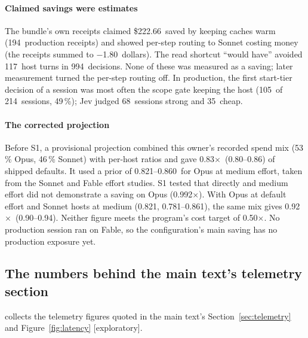 \documentclass[11pt,letterpaper]{article}
\newcommand{\expl}{\mbox{\textsf{\small\color{okgray}[exploratory]}}}
\newcommand{\X}{\ensuremath{\times}}
\newcommand{\AthreeGoal}{0.50}
\newcommand{\AthreeNew}{0.92}
\newcommand{\AthreeNewBand}{0.90--0.94}
\newcommand{\AthreeOld}{0.83}
\newcommand{\AthreeOldBand}{0.80--0.86}
\newcommand{\AthreeOpusPriorHi}{0.860}
\newcommand{\AthreeOpusPriorLo}{0.821}
\newcommand{\AthreeOpusShare}{53}
\newcommand{\AthreeSonnetShare}{46}
\newcommand{\EcCI}{0.781--0.861}
\newcommand{\EcRatio}{0.821}
\newcommand{\ObCheaperUSD}{$-$1.80}
\newcommand{\ObClaimDecisions}{994}
\newcommand{\ObClaimTurns}{117}
\newcommand{\ObKeepaliveN}{194}
\newcommand{\ObKeepaliveUSD}{222.66}
\newcommand{\ObStJevCheap}{35}
\newcommand{\ObStJevStrong}{68}
\newcommand{\ObStScope}{105}
\newcommand{\ObStScopePct}{49}
\newcommand{\ObStTotal}{214}
\newcommand{\SHFourRatio}{0.992}
\newcommand{\mainpaper}{the main text}\newcommand{\thissupp}{these appendices}\newcommand{\Thissupp}{These appendices}
\begin{document}
\paragraph{Claimed savings were estimates} The bundle's own receipts claimed \$\ObKeepaliveUSD\ saved by keeping
caches warm (\ObKeepaliveN\ production receipts) and showed per-step routing to Sonnet costing money (the receipts summed to \ObCheaperUSD\ dollars).
The read shortcut ``would have'' avoided \ObClaimTurns\ host turns in \ObClaimDecisions\ decisions. None of these was
measured as a saving; later measurement turned the per-step routing off. In production, the first start-tier decision
of a session was most often the scope gate keeping the host (\ObStScope\ of \ObStTotal\ sessions,
\ObStScopePct\,\%); Jev judged \ObStJevStrong\ sessions strong and \ObStJevCheap\ cheap.


\paragraph{The corrected projection} Before S1, a provisional projection combined this owner's recorded spend mix
(\AthreeOpusShare\,\% Opus, \AthreeSonnetShare\,\% Sonnet) with per-host ratios and gave \AthreeOld\X\ (\AthreeOldBand)
of shipped defaults. It used a prior of \AthreeOpusPriorLo--\AthreeOpusPriorHi\ for Opus at medium effort, taken from
the Sonnet and Fable effort studies. S1 tested that directly and medium effort did not demonstrate a saving on Opus
(\SHFourRatio\X). With Opus at default effort and Sonnet hosts at medium (\EcRatio, \EcCI), the same mix gives
\AthreeNew\X\ (\AthreeNewBand). Neither figure meets the program's cost target of \AthreeGoal\X. No production session
ran on Fable, so the configuration's main saving has no production exposure yet.
\subsection{The numbers behind \mainpaper{}'s telemetry section}\label{sec:ftrace}

 collects the telemetry figures quoted in \mainpaper{}'s Section~\ref{sec:telemetry} and Figure~\ref{fig:latency} \expl.
\end{document}
